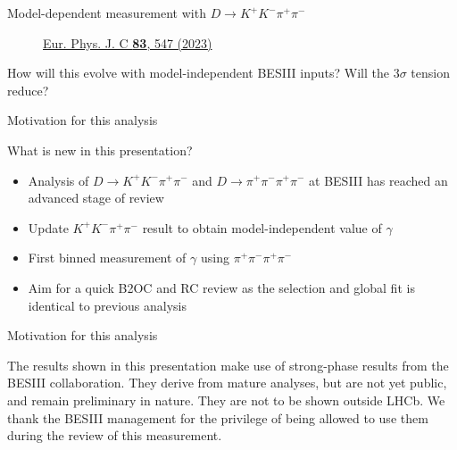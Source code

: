 \documentclass[xcolor={dvipsnames}]{beamer}
\begin{document}
\begin{frame}{Model-dependent measurement with $D\to K^+K^-\pi^+\pi^-$}
\begin{figure}[htb]
\begin{subfigure}{0.5\textwidth}
    \end{subfigure}
    \vspace{-0.5cm}
    \caption*{\tiny\href{https://link.springer.com/article/10.1140/epjc/s10052-023-11560-5}{Eur. Phys. J. C \textbf{83}, 547 (2023)}}
  \end{figure}
  \vspace{-0.5cm}
  \begin{center}
    {\large How will this evolve with model-independent BESIII inputs? Will the $3\sigma$ tension reduce?}
  \end{center}
\end{frame}

\begin{frame}{Motivation for this analysis}
  \begin{center}
    {\large What is new in this presentation?}
  \end{center}
  \begin{itemize}
    \setlength\itemsep{1.5em}
    \item{Analysis of $D\to K^+K^-\pi^+\pi^-$ and $D\to\pi^+\pi^-\pi^+\pi^-$ at BESIII has reached an advanced stage of review}
    \item{Update $K^+K^-\pi^+\pi^-$ result to obtain model-independent value of $\gamma$}
    \item{First binned measurement of $\gamma$ using $\pi^+\pi^-\pi^+\pi^-$}
    \item{Aim for a quick B2OC and RC review as the selection and global fit is identical to previous analysis}
  \end{itemize}
\end{frame}

\begin{frame}{Motivation for this analysis}
  \begin{center}
    {\color{blue}The results shown in this presentation make use of strong-phase results from the BESIII collaboration. They derive from mature analyses, but are not yet public, and remain preliminary in nature. They are not to be shown outside LHCb. We thank the BESIII management for the privilege of being allowed to use them during the review of this measurement.}
  \end{center}
\end{frame}
\end{document}
